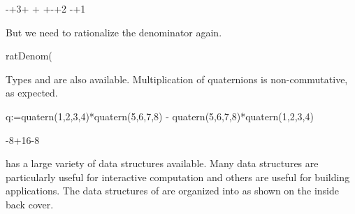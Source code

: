 {{{{{{{{\begin{xtc}
\begin{TeXOutput}
\begin{fricasmath}{35}
{-{}+3}{\TIMES {}+%
\TIMES {}+%
\TIMES {}+-{}+2\TIMES %
-{}+1}%
\end{fricasmath}
\end{TeXOutput}
\end{xtc}
\begin{xtc}
\begin{xtccomment}
But we need to rationalize the denominator again.
\end{xtccomment}
\begin{spadsrc}
ratDenom(%
\end{spadsrc}
\begin{TeXOutput}
\begin{fricasmath}{36}
%
\end{fricasmath}
\end{TeXOutput}
\end{xtc}
\begin{xtc}
\begin{xtccomment}
Types  and  are also available.
Multiplication of quaternions is non-commutative, as expected.
\end{xtccomment}
\begin{spadsrc}
q:=quatern(1,2,3,4)*quatern(5,6,7,8) - quatern(5,6,7,8)*quatern(1,2,3,4)
\end{spadsrc}
\begin{TeXOutput}
\begin{fricasmath}{37}
-{8\TIMES {}}+16\TIMES {}-{8\TIMES {}}%
\end{fricasmath}
\end{TeXOutput}
\end{xtc}

%

\Language{} has a large variety of data structures available.
Many data structures are particularly useful for interactive
computation and others are useful for building applications.
The data structures of \Language{} are organized into
 as shown on
the inside back cover.

}}}}}}}}
